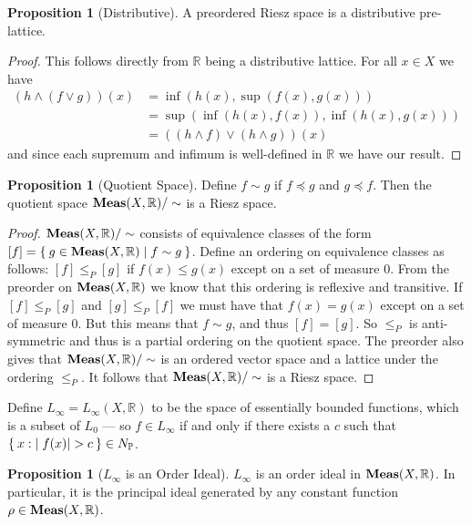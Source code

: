 \documentclass[letterpaper,10pt,oneside,onecolumn,reqno]{amsart}
\renewcommand{\P}{\mathbb P}
\newcommand{\R}{\mathbb R}
\theoremstyle{definition}
\newtheorem{pro}[thm]{Proposition}
\newcommand{\catname}[1]{{\normalfont\textbf{#1}}}
\newcommand{\Meas}{\catname{Meas}}
\newcommand{\meet}{\wedge}
\newcommand{\join}{\vee}
\begin{document}
\begin{pro}[Distributive]\label{pro:2}
  A preordered Riesz space is a distributive pre-lattice.
\end{pro}

\begin{proof}
  This follows directly from $\R$ being a distributive lattice. For
  all $x \in X$ we have
  \begin{align*}
    (h \meet (f \join g))(x) &= \inf(h(x), \sup(f(x),g(x))) \\
    &= \sup(\inf(h(x),f(x)),\inf(h(x),g(x))) \\
    &= ((h \meet f) \join (h \meet g))(x)
  \end{align*}
  and since each supremum and infimum is well-defined in $\R$ we have
  our result.
\end{proof}

\begin{pro}[Quotient Space]\label{pro:3}
  Define $f \sim g$ if $f \preceq g$ and $g \preceq f$. Then the
  quotient space $\Meas(X,\R)/\sim$ is a Riesz space.
\end{pro}

\begin{proof}
  $\Meas(X, \R)/\sim$ consists of equivalence classes of the form $[f]
  = \Set{g \in \Meas(X, \R) | f \sim g }$. Define an ordering on
  equivalence classes as follows: $[f] \leq_P [g]$ if $f(x) \leq g(x)$
  except on a set of measure $0$. From the preorder on $\Meas(X,\R)$
  we know that this ordering is reflexive and transitive.  If $[f]
  \leq_P [g]$ and $[g] \leq_P [f]$ we must have that $f(x) = g(x)$
  except on a set of measure $0$. But this means that $f \sim g$, and
  thus $[f] = [g]$. So $\leq_P$ is anti-symmetric and thus is a
  partial ordering on the quotient space. The preorder also gives that
  $\Meas(X,\R)/\sim$ is an ordered vector space and a lattice under
  the ordering $\leq_P$. It follows that $\Meas(X,\R)/\sim$ is a Riesz
  space.
\end{proof}

Define $L_{\infty}=L_{\infty}(X,\R)$ to be the space of essentially
bounded functions, which is a subset of $L_0$ --- so $f \in
L_{\infty}$ if and only if there exists a $c$ such that $\Set{x :
  |f(x)| > c} \in N_{\P}$.

\begin{pro}[$L_{\infty}$ is an Order Ideal]\label{pro:4}
  $L_{\infty}$ is an order ideal in $\Meas(X,\R)$. In particular, it
  is the principal ideal generated by any constant function $\rho \in
  \Meas(X,\R)$.
\end{pro}
\end{document}
